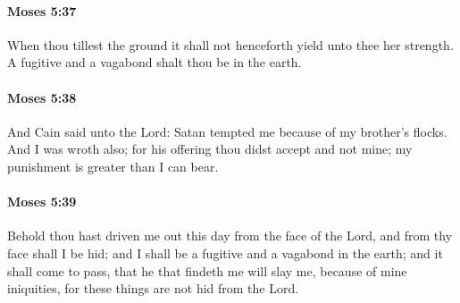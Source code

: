 		\paragraph{Moses 5:37} %
			\label{MOSES-5-37}

			When thou tillest the ground it shall not henceforth yield unto thee her strength. A fugitive and a vagabond shalt thou be in the earth.


		\paragraph{Moses 5:38} %
			\label{MOSES-5-38}

			And Cain said unto the Lord: Satan tempted me because of my brother's flocks. And I was wroth also; for his offering thou didst accept and not mine; my punishment is greater than I can bear.


		\paragraph{Moses 5:39} %
			\label{MOSES-5-39}

			Behold thou hast driven me out this day from the face of the Lord, and from thy face shall I be hid; and I shall be a fugitive and a vagabond in the earth; and it shall come to pass, that he that findeth me will slay me, because of mine iniquities, for these things are not hid from the Lord.


